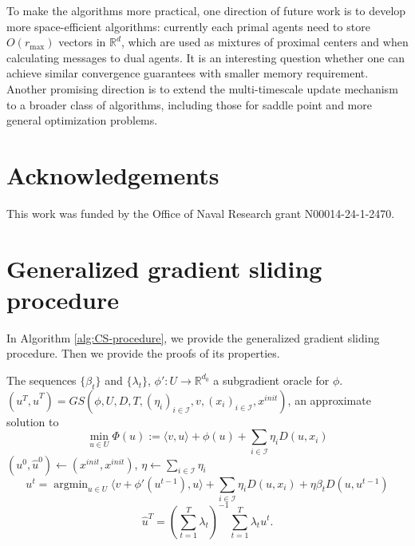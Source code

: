 \documentclass[10pt]{article}
\newcommand{\mc}{\mathcal}
\newcommand{\R}{\mathbb{R}}
\DeclareMathOperator*{\argmin}{argmin}
\begin{document}
To make the algorithms more practical, one direction of future work is to develop more space-efficient algorithms: currently each primal agents need to store $O(r_{\max})$ vectors in $\R^d$, which are used as mixtures of proximal centers and when calculating messages to dual agents. It is an interesting question whether one can achieve similar convergence guarantees with smaller memory requirement. Another promising direction is to extend the multi-timescale update mechanism to a broader class of algorithms, including those for saddle point and more general optimization problems.


\section*{Acknowledgements}
This work was funded by the Office of Naval Research grant N00014-24-1-2470.


\printbibliography

\appendix
\section{Generalized gradient sliding procedure}\label{sec:generalized-CS}
In Algorithm \ref{alg:CS-procedure}, we provide the generalized gradient sliding procedure. Then we provide the proofs of its properties. 

\begin{algorithm}
\caption{Generalized gradient sliding procedure}\label{alg:CS-procedure}
\begin{algorithmic}
\Require The sequences $\{\beta_t\}$ and $\{\lambda_t\}$, $\phi':U\to \R^{d_0}$ a subgradient oracle for $\phi$. 
\Ensure $(u^T,\widehat{u}^T) = GS(\phi,U,D,T,(\eta_i)_{i\in \mc I},v,(x_i)_{i\in \mc I},x^{init})$, an approximate solution to
\begin{displaymath}
    \min_{u\in U} \Phi(u):=\langle v,u\rangle + \phi(u) + \sum_{i\in \mc I} \eta_i D(u,x_i) 
\end{displaymath}
\State $(u^0,\widehat{u}^0)\gets (x^{init},x^{init})$, $\eta\gets \sum_{i\in \mc I} \eta_i$
\State \begin{displaymath}
    u^t = \argmin_{u\in U}\langle v+  \phi'(u^{t-1}),u\rangle + \sum_{i\in \mc I} \eta_i D(u,x_i) + \eta \beta_tD(u,u^{t-1})
\end{displaymath}
\EndFor
\State \begin{displaymath}
    \widehat{u}^T = (\sum_{t=1}^T \lambda_t)^{-1} \sum_{t=1}^T \lambda_t u^t.
\end{displaymath}
\end{algorithmic}
\end{algorithm}
\end{document}
